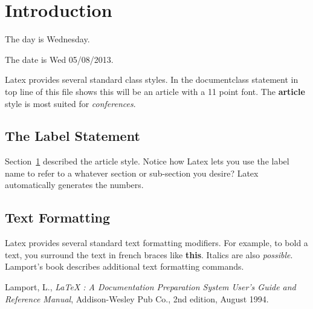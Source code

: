 \documentclass[11pt]{article}
\begin{document}
         
\section{Introduction}
\label{Introduction}

The day is Wednesday.  

The date is Wed 05/08/2013.

Latex provides several standard class styles.  In the
documentclass statement in top line of this file shows this
will be an article with a 11 point font.  The {\bf article} 
style is most suited for {\it conferences}.

\subsection{The Label Statement}
\label{labelStatement}

Section~\ref{Introduction} described the article style.  Notice
how Latex lets you use the label name to refer to a whatever
section or sub-section you desire?  Latex automatically generates
the numbers.

\subsection{Text Formatting}
\label{textFormatting}

Latex provides several standard text formatting modifiers.
For example, to bold a text, you surround the text in french
braces like {\bf this}.  Italics are also {\it possible}.
Lamport's book \cite{lamport} describes additional text formatting
commands.

\begin{thebibliography}{99}
 Lamport, L., {\it LaTeX : A Documentation
 Preparation System User's Guide and Reference Manual}, Addison-Wesley 
 Pub Co., 2nd edition, August 1994.
\end{thebibliography}
 
\end{document}
